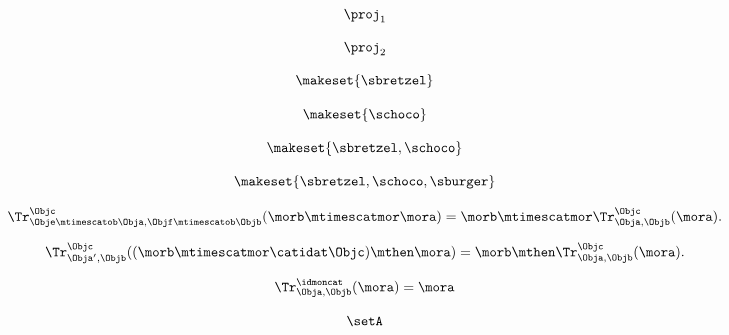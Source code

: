 {\begin{forslides}
        \begin{equation}
            \label{eq:feedback-154}
            \proj_1
        \end{equation}

        \begin{equation}
            \label{eq:feedback-155}
            \proj_2
        \end{equation}

        \begin{equation}
            \label{eq:feedback-156}
            \makeset{ \sbretzel }
        \end{equation}

        \begin{equation}
            \label{eq:feedback-157}
            \makeset{ \schoco }
        \end{equation}

        \begin{equation}
            \label{eq:feedback-158}
            \makeset{ \sbretzel, \schoco }
        \end{equation}

        \begin{equation}
            \label{eq:feedback-159}
            \makeset{ \sbretzel, \schoco, \sburger }
        \end{equation}

        \begin{equation}
            \label{eq:feedback-160}
            \Tr_{\Obje\mtimescatob \Obja,\Objf\mtimescatob \Objb}^{\Objc}(\morb \mtimescatmor \mora)=\morb \mtimescatmor \Tr_{\Obja,\Objb}^\Objc(\mora).
        \end{equation}

        \begin{equation}
            \label{eq:feedback-161}
            \Tr_{\Obja', \Objb}^\Objc ( (\morb \mtimescatmor \catidat\Objc) \mthen \mora) = \morb \mthen \Tr_{\Obja, \Objb}^\Objc (\mora).
        \end{equation}

        \begin{equation}
            \label{eq:feedback-162}
            \Tr_{\Obja,\Objb}^\idmoncat (\mora)=\mora
        \end{equation}

        \begin{equation}
            \label{eq:feedback-163}
            \setA
        \end{equation}


\end{forslides}}
